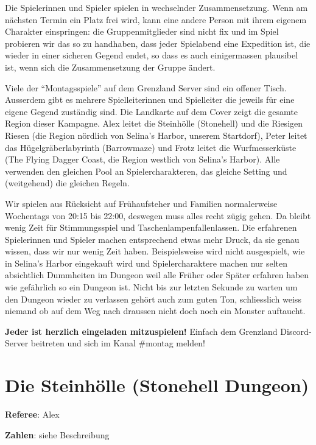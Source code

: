 \documentclass[11pt]{wbzine}
\begin{document}
\begin{multicols}{2}
Die Spielerinnen und Spieler spielen in wechselnder Zusammensetzung. Wenn am
nächsten Termin ein Platz frei wird, kann eine andere Person mit ihrem eigenem
Charakter einspringen: die Gruppenmitglieder sind nicht fix und im Spiel
probieren wir das so zu handhaben, dass jeder Spielabend eine Expedition ist,
die wieder in einer sicheren Gegend endet, so dass es auch einigermassen
plausibel ist, wenn sich die Zusammensetzung der Gruppe ändert.

Viele der ``Montagsspiele'' auf dem Grenzland Server sind ein offener Tisch.
Ausserdem gibt es mehrere Spielleiterinnen und Spielleiter die jeweils für
eine eigene Gegend zuständig sind. Die Landkarte auf dem Cover zeigt die
gesamte Region dieser Kampagne. Alex leitet die Steinhölle (Stonehell) und die
Riesigen Riesen (die Region nördlich von Selina's Harbor, unserem Startdorf),
Peter leitet das Hügelgräberlabyrinth (Barrowmaze) und Frotz leitet die
Wurfmesserküste (The Flying Dagger Coast, die Region westlich von Selina's
Harbor). Alle verwenden den gleichen Pool an Spielercharakteren, das gleiche
Setting und (weitgehend) die gleichen Regeln.

Wir spielen aus Rücksicht auf Frühaufsteher und Familien normalerweise
Wochentags von 20:15 bis 22:00, deswegen muss alles recht zügig gehen. Da
bleibt wenig Zeit für Stimmungsspiel und Taschenlampenfallenlassen. Die
erfahrenen Spielerinnen und Spieler machen entsprechend etwas mehr Druck, da
sie genau wissen, dass wir nur wenig Zeit haben. Beispielsweise wird nicht
ausgespielt, wie in Selina's Harbor eingekauft wird und Spielercharaktere
machen nur selten absichtlich Dummheiten im Dungeon weil alle Früher oder
Später erfahren haben wie gefährlich so ein Dungeon ist. Nicht bis zur letzten
Sekunde zu warten um den Dungeon wieder zu verlassen gehört auch zum guten Ton,
schliesslich weiss niemand ob auf dem Weg nach draussen nicht doch noch ein
Monster auftaucht.

\textbf{Jeder ist herzlich eingeladen mitzuspielen!} Einfach dem Grenzland
Discord-Server beitreten und sich im Kanal \#montag melden!


\section{Die Steinhölle (Stonehell Dungeon)}

\textbf{Referee}: Alex

\textbf{Zahlen}: siehe Beschreibung


\end{multicols}
\end{document}
